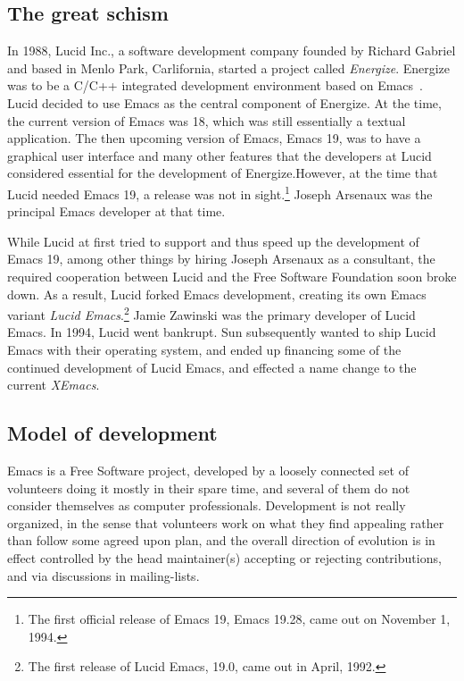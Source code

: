 \documentclass[format=acmsmall, review]{acmart}
\begin{document}
\subsection{The great schism}

In 1988, Lucid Inc., a software development company founded by Richard
Gabriel and based in Menlo
Park, Carlifornia, started a project called \emph{Energize}.
Energize was to be a C/C++ integrated development environment based on
Emacs~\cite{GabrielLetter}.  Lucid decided to use Emacs as the central
component of Energize.  At the time, the current version of Emacs was
18, which was still essentially a textual application.  The then
upcoming version of Emacs, Emacs 19, was to have a graphical user
interface and many other features that the developers at Lucid
considered essential for the development of Energize.However, at the
time that Lucid needed Emacs 19, a release was not in
sight.\footnote{The first official release of Emacs 19, Emacs
  19.28, came out on November 1, 1994.}  Joseph Arsenaux was
the principal Emacs developer at that time.

While Lucid at first tried to support and thus speed up the
development of Emacs 19, among other things by hiring Joseph Arsenaux as
a consultant, the required cooperation between Lucid and
the Free Software Foundation soon broke down.  As a result, Lucid
forked Emacs development, creating its own Emacs variant \emph{Lucid
Emacs}.\footnote{The first release of Lucid Emacs, 19.0, came out in April,
1992.}  Jamie Zawinski was the primary developer of Lucid Emacs.
In 1994, Lucid went bankrupt.  Sun subsequently wanted to ship
Lucid Emacs with their operating system, and ended up financing some
of the continued development of Lucid Emacs, and effected a name
change to the current \emph{XEmacs}.

\subsection{Model of development}

Emacs is a Free Software project, developed by a loosely connected
set of volunteers doing it mostly in their spare time, and several of them
do not consider themselves as computer professionals.  Development is not
really organized, in the sense that volunteers work on what they find
appealing rather than follow some agreed upon plan, and the overall
direction of evolution is in effect controlled by the head maintainer(s)
accepting or rejecting contributions, and via discussions in mailing-lists.
\end{document}
